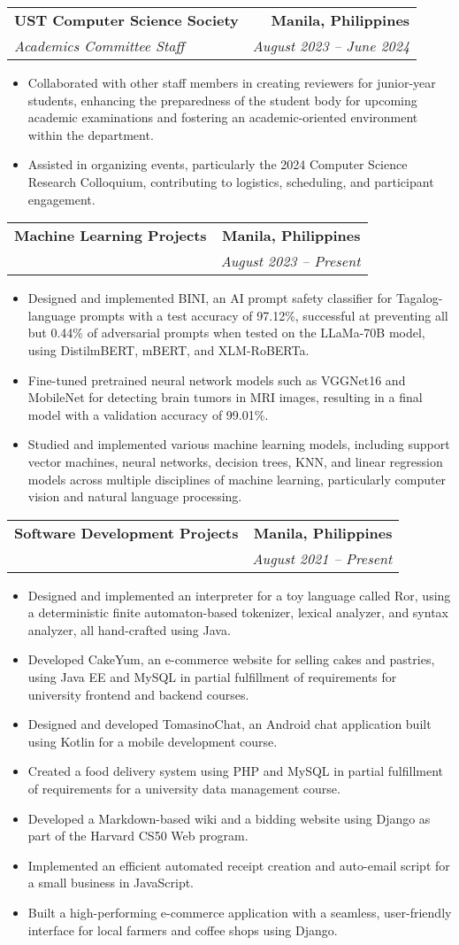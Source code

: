 \documentclass[letterpaper,11pt]{article}
\makeatletter
\newcommand{\resumeItem}[1]{
  \item\small{
    {#1 \vspace{-2pt}}
  }
}
\newcommand{\resumeSubheading}[4]{
  \vspace{-2pt}\item
    \begin{tabular*}{1.0\textwidth}[t]{l@{\extracolsep{\fill}}r}
      \textbf{#1} & \textbf{\small #2} \\
      \textit{\small#3} & \textit{\small #4} \\
    \end{tabular*}\vspace{-7pt}
}
\newcommand{\resumeItemListStart}{\begin{itemize}}
\newcommand{\resumeItemListEnd}{\end{itemize}\vspace{-5pt}}
\makeatother
\begin{document}
    \resumeSubheading
      {UST Computer Science Society}{Manila, Philippines}
      {Academics Committee Staff}{August 2023 -- June 2024}
      \resumeItemListStart
        \resumeItem{Collaborated with other staff members in creating reviewers for junior-year students, enhancing the preparedness of the student body for upcoming academic examinations and fostering an academic-oriented environment within the department.}
        \resumeItem{Assisted in organizing events, particularly the 2024 Computer Science Research Colloquium, contributing to logistics, scheduling, and participant engagement.}
      \resumeItemListEnd

    \resumeSubheading
      {Machine Learning Projects}{Manila, Philippines}
      {}{August 2023 -- Present}
      \resumeItemListStart
        \resumeItem{Designed and implemented BINI, an AI prompt safety classifier for Tagalog-language prompts with a test accuracy of 97.12\%, successful at preventing all but 0.44\% of adversarial prompts when tested on the LLaMa-70B model, using DistilmBERT, mBERT, and XLM-RoBERTa.}
        \resumeItem{Fine-tuned pretrained neural network models such as VGGNet16 and MobileNet for detecting brain tumors in MRI images, resulting in a final model with a validation accuracy of 99.01\%.}
        \resumeItem{Studied and implemented various machine learning models, including support vector machines, neural networks, decision trees, KNN, and linear regression models across multiple disciplines of machine learning, particularly computer vision and natural language processing.}
      \resumeItemListEnd

    \resumeSubheading
      {Software Development Projects}{Manila, Philippines}
      {}{August 2021 -- Present}
      \resumeItemListStart
        \resumeItem{Designed and implemented an interpreter for a toy language called Ror, using a deterministic finite automaton-based tokenizer, lexical analyzer, and syntax analyzer, all hand-crafted using Java.}
        \resumeItem{Developed CakeYum, an e-commerce website for selling cakes and pastries, using Java EE and MySQL in partial fulfillment of requirements for university frontend and backend courses.}
        \resumeItem{Designed and developed TomasinoChat, an Android chat application built using Kotlin for a mobile development course.}\resumeItem{Created a food delivery system using PHP and MySQL in partial fulfillment of requirements for a university data management course.}
        \resumeItem{Developed a Markdown-based wiki and a bidding website using Django as part of the Harvard CS50 Web program.}
        \resumeItem{Implemented an efficient automated receipt creation and auto-email script for a small business in JavaScript.}
        \resumeItem{Built a high-performing e-commerce application with a seamless, user-friendly interface for local farmers and coffee shops using Django.}
      \resumeItemListEnd
\end{document}
